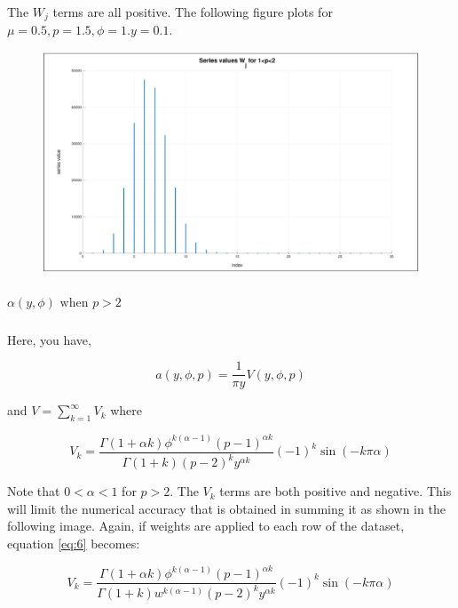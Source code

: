 The $W_j$ terms are all positive. The following figure plots for $\mu = 0.5, p=1.5, \phi =1. y=0.1$.

\begin{figure}[h]
\centering
\includegraphics[scale=0.25]{images/dispersion_param_fig1.png}
\end{figure}

\subparagraph{$\alpha (y, \phi) \text{ when } p > 2$}

Here, you have,

\begin{equation} \label{eq:6}
a(y, \phi, p) = \frac{1}{\pi y}V(y,\phi, p)
\end{equation}

and $V = \sum^{\infty}_{k=1} V_k$ where

\begin{equation} \label{eq:7}
V_k = \frac{\Gamma(1+\alpha k)\phi^{k(\alpha - 1)}(p-1)^{\alpha k}}{\Gamma(1+k)(p-2)^ky^{\alpha k}}(-1)^k \sin (-k\pi \alpha)
\end{equation}

Note that $0 < \alpha < 1$ for $p > 2$. The $V_k$ terms are both positive and negative. This will limit the numerical accuracy that is obtained in summing it as shown in the following image. Again, if weights are applied to each row of the dataset, equation \ref{eq:6} becomes:

\begin{equation} \label{eq:8}
V_k = \frac{\Gamma(1+\alpha k)\phi^{k(\alpha -1)}(p-1)^{\alpha k}}{\Gamma(1+k)w^{k(\alpha -1)}(p-2)^ky^{\alpha k}}(-1)^k \sin (-k\pi \alpha)
\end{equation}

\waterExampleInR


